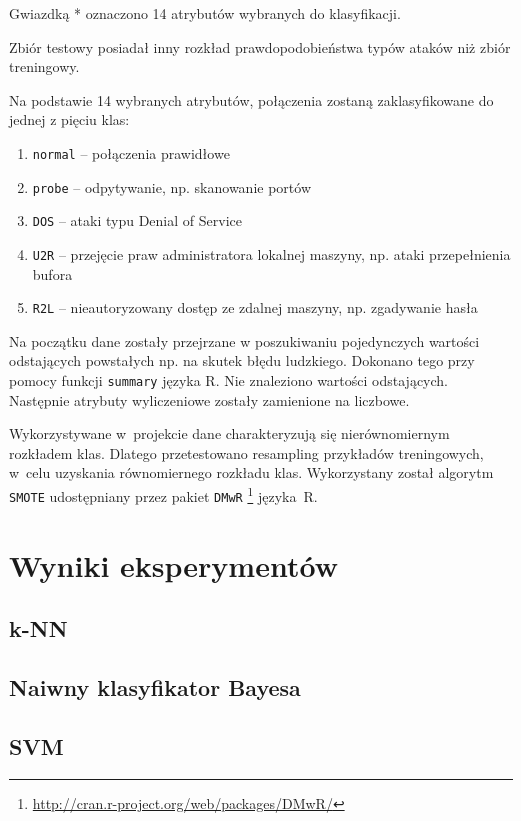 \documentclass[a4paper, 12pt]{article}
\begin{document}
Gwiazdką * oznaczono 14 atrybutów wybranych do klasyfikacji.

Zbiór testowy posiadał inny rozkład prawdopodobieństwa typów ataków niż zbiór treningowy.

Na podstawie 14 wybranych atrybutów, połączenia zostaną zaklasyfikowane do jednej z pięciu klas:

\begin{enumerate}
 \item \texttt{normal} -- połączenia prawidłowe
 \item \texttt{probe} -- odpytywanie, np. skanowanie portów
 \item \texttt{DOS} -- ataki typu Denial of Service
 \item \texttt{U2R} -- przejęcie praw administratora lokalnej maszyny, np. ataki przepełnienia bufora
 \item \texttt{R2L} -- nieautoryzowany dostęp ze zdalnej maszyny, np. zgadywanie hasła
\end{enumerate}

Na początku dane zostały przejrzane w poszukiwaniu pojedynczych wartości odstających
powstałych np. na skutek błędu ludzkiego. Dokonano tego przy pomocy funkcji \texttt{summary}
języka R. Nie znaleziono wartości odstających. 
Następnie atrybuty wyliczeniowe zostały zamienione na liczbowe.

Wykorzystywane w~projekcie dane charakteryzują się nierównomiernym rozkładem klas. 
Dlatego przetestowano resampling przykładów treningowych, w~celu uzyskania równomiernego rozkładu klas. 
Wykorzystany został algorytm \texttt{SMOTE} udostępniany przez pakiet 
\texttt{DMwR} \footnote{\url{http://cran.r-project.org/web/packages/DMwR/}} języka~R.

\section{Wyniki eksperymentów}

\subsection{k-NN}

\subsection{Naiwny klasyfikator Bayesa}

\subsection{SVM}
\end{document}
